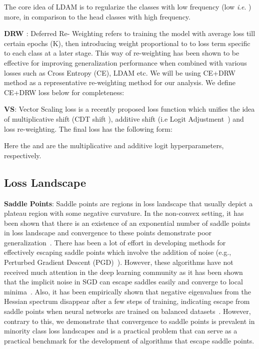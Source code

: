 \documentclass{article}
\newcommand{\ie}{\textit{i}.\textit{e}. }
\begin{document}
The core idea of LDAM is to regularize the classes with low frequency (low \ie ) more, in comparison to the head classes with high frequency.

\textbf{DRW \cite{cao2019learning}}: Deferred Re- Weighting refers to training the model with average loss till certain epochs (K), then introducing weight  proportional to   to loss term specific to each class  at a later stage. This way of re-weighting has been shown to be effective for improving generalization performance when combined with various losses such as Cross Entropy (CE), LDAM etc. We will be using CE+DRW method as a representative re-weighting method for our analysis. We define CE+DRW loss below for completeness:



\textbf{VS\cite{kini2021label}}: Vector Scaling loss is a recently proposed loss function which unifies the idea of multiplicative shift (CDT shift \cite{ye2020identifying}), additive shift (i.e Logit Adjustment~\cite{menon2020long}) and loss re-weighting. The final loss has the following form:

Here the  and  are the multiplicative and additive logit hyperparameters, respectively.     
\subsection{Loss Landscape}
\textbf{Saddle Points}: Saddle points are regions in loss landscape that usually depict a plateau region with some negative curvature. In the non-convex setting, it has been shown that there is an existence of an exponential number of saddle points in loss landscape and convergence to these points demonstrate poor generalization~\cite{dauphin2014identifying}. There has been a lot of effort in developing methods for effectively escaping saddle points which involve the addition of noise (e.g., Perturbed Gradient Descent (PGD)~\cite{ge2015escaping, jin2017escape, Jin2019StochasticGD}). However, these algorithms have not received much attention in the deep learning community as it has been shown that the implicit noise in SGD can escape saddles easily and converge to local minima~\cite{daneshmand2018escaping}. Also, it has been empirically shown that negative eigenvalues from the Hessian spectrum disappear after a few steps of training, indicating escape from saddle points when neural networks are trained on balanced datasets~\cite{alain2019negative, chaudhari2019entropy, sagun2017empirical}. However, contrary to this, we demonstrate that convergence to saddle points is prevalent in minority class loss landscapes and is a practical problem that can serve as a practical benchmark for the development of algorithms that escape saddle points.  
\end{document}
